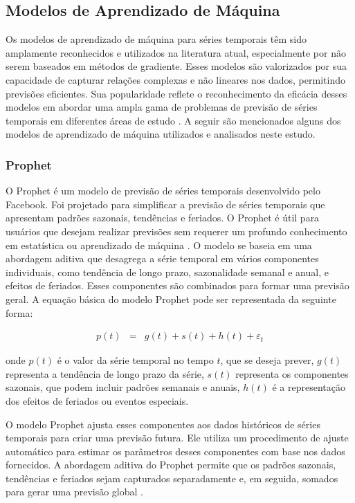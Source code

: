  \subsection{Modelos de Aprendizado de M\'aquina}\label{subsec:reg}
 
 Os modelos de aprendizado de máquina para séries temporais têm sido amplamente reconhecidos e utilizados na literatura atual, especialmente por não serem baseados em métodos de gradiente. Esses modelos são valorizados por sua capacidade de capturar relações complexas e não lineares nos dados, permitindo previsões eficientes. Sua popularidade reflete o reconhecimento da eficácia desses modelos em abordar uma ampla gama de problemas de previsão de séries temporais em diferentes áreas de estudo \cite{al2021machine, sen2022machine, kheiri2023sentimentgpt}. A seguir são mencionados alguns dos modelos de aprendizado de máquina utilizados e analisados neste estudo.
 
  \subsubsection{Prophet}
 
 O Prophet é um modelo de previsão de séries temporais desenvolvido pelo Facebook. Foi projetado para simplificar a previsão de séries temporais que apresentam padrões sazonais, tendências e feriados. O Prophet é útil para usuários que desejam realizar previsões sem requerer um profundo conhecimento em estatística ou aprendizado de máquina \cite{en16031371}. O modelo se baseia em uma abordagem aditiva que desagrega a série temporal em vários componentes individuais, como tendência de longo prazo, sazonalidade semanal e anual, e efeitos de feriados. Esses componentes são combinados para formar uma previsão geral.  A equação básica do modelo Prophet pode ser representada da seguinte forma:
 
 \begin{eqnarray}
 	p(t) &=& g(t) + s(t) + h(t) + \varepsilon_t 
 \end{eqnarray}
 
 \noindent onde \( p(t) \) é o valor da série temporal no tempo \( t \), que se deseja prever, \( g(t) \) representa a tendência de longo prazo da série, \( s(t) \) representa os componentes sazonais, que podem incluir padrões semanais e anuais, \( h(t) \) é a representação dos efeitos de feriados ou eventos especiais.
  
 O modelo Prophet ajusta esses componentes aos dados históricos de séries temporais para criar uma previsão futura. Ele utiliza um procedimento de ajuste automático para estimar os parâmetros desses componentes com base nos dados fornecidos. A abordagem aditiva do Prophet permite que os padrões sazonais, tendências e feriados sejam capturados separadamente e, em seguida, somados para gerar uma previsão global \cite{2-s2.0-85092514286}.
 
